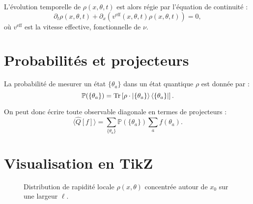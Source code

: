 \documentclass[11pt]{article}
\begin{document}
L'évolution temporelle de $\rho(x,\theta,t)$ est alors régie par l'équation de continuité :
\begin{equation}
    \partial_t \rho(x,\theta,t) + \partial_x \left( v^{\text{eff}}(x,\theta,t) \rho(x,\theta,t) \right) = 0,
\end{equation}
où $v^{\text{eff}}$ est la vitesse effective, fonctionnelle de $\nu$.

\section{Probabilités et projecteurs}

La probabilité de mesurer un état $\{ \theta_a \}$ dans un état quantique $\rho$ est donnée par :
\begin{equation}
    \mathbb{P}(\{\theta_a\}) = \Tr \left[ \rho \cdot \ket{\{\theta_a\}}\bra{\{\theta_a\}} \right].
\end{equation}

On peut donc écrire toute observable diagonale en termes de projecteurs :
\begin{equation}
    \langle \hat{Q}[f] \rangle = \sum_{\{\theta_a\}} \mathbb{P}(\{\theta_a\}) \sum_a f(\theta_a).
\end{equation}

\section{Visualisation en TikZ}

\begin{figure}[h]
\centering
{}
\caption{Distribution de rapidité locale $\rho(x,\theta)$ concentrée autour de $x_0$ sur une largeur $\ell$.}
\end{figure}
\end{document}
